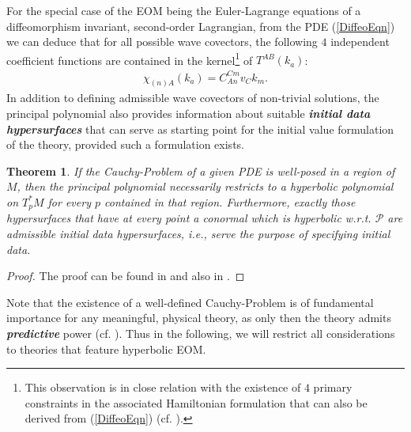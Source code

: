 \documentclass[%
 reprint,
nofootinbib,
 amsmath,amssymb,
 aps,
 prd,
floatfix,
]{revtex4-2}
\newtheorem{theorem}{Theorem}
\begin{document}
For the special case of the EOM being the Euler-Lagrange equations of a diffeomorphism invariant, second-order Lagrangian, from the PDE (\ref{DiffeoEqn}) we can deduce that for all possible wave covectors, the following $4$ independent coefficient functions are contained in the kernel\footnote{This observation is in close relation with the existence of $4$ primary constraints in the associated Hamiltonian formulation that can also be derived from (\ref{DiffeoEqn}) (cf. \cite{TobiMaster}).}  of $T^{AB}(k_a)$: 
\begin{align}
   \chi_{(n)A}(k_a) =  C_{An}^{Cm}v_Ck_m.
\end{align}
In addition to defining admissible wave covectors of non-trivial solutions, the principal polynomial also provides information about suitable \textit{\textbf{initial data hypersurfaces}} that can serve as starting point for the initial value formulation of the theory, provided such a formulation exists.
\begin{theorem}
If the Cauchy-Problem of a given PDE is well-posed in a region of $M$, then the principal polynomial necessarily restricts to a hyperbolic polynomial on $T_p^{\ast}M$ for every $p$ contained in that region. Furthermore, exactly those hypersurfaces that have at every point a conormal which is hyperbolic w.r.t. $\mathcal{P}$ are admissible initial data hypersurfaces, i.e., serve the purpose of specifying initial data.
\end{theorem}
\begin{proof}
The proof can be found in \cite{Hormander1977} and also in \cite{Ivrii_1974}.
\end{proof}
Note that the existence of a well-defined Cauchy-Problem is of fundamental importance for any meaningful, physical theory, as only then the theory admits \textit{\textbf{predictive}} power (cf. \cite{Rivera}).  Thus in the following, we will restrict all considerations to theories that feature hyperbolic EOM.
\end{document}
